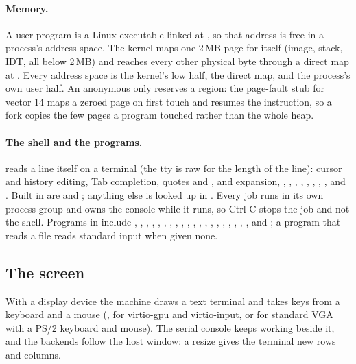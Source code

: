 \paragraph{Memory.} A user program is a Linux executable linked at
, so that address is free in a process's address space. The
kernel maps one 2\,MB page for itself (image, stack, IDT, all below 2\,MB) and
reaches every other physical byte through a direct map at
. Every address space is the kernel's low half, the
direct map, and the process's own user half. An anonymous  only
reserves a region: the page-fault stub for vector 14 maps a zeroed page on
first touch and resumes the instruction, so a fork copies the few pages a
program touched rather than the whole heap.

\paragraph{The shell and the programs.}  reads a line itself on a
terminal (the tty is raw for the length of the line): cursor and history
editing, Tab completion, quotes and \ic{\bs},  and 
expansion, \ic{|}, \ic{<}, \ic{>}, \ic{>>}, , \ic{;}, \ic{\&\&},
\ic{||}, \ic{\&} and \ic{\#}. Built in are  and ; anything else is looked up in
. Every job runs in its own process group and owns the console
while it runs, so Ctrl-C stops the job and not the shell. Programs in
 include , , , , ,
, , , , , , ,
, , , , , ,
, ,  and ; a program that reads a
file reads standard input when given none.

\subsection{The screen}

With a display device the machine draws a text terminal and takes keys from a
keyboard and a mouse (,  for
virtio-gpu and virtio-input, or  for standard VGA with a PS/2
keyboard and mouse). The serial console keeps working beside it, and the
backends follow the host window: a resize gives the terminal new rows and
columns.

